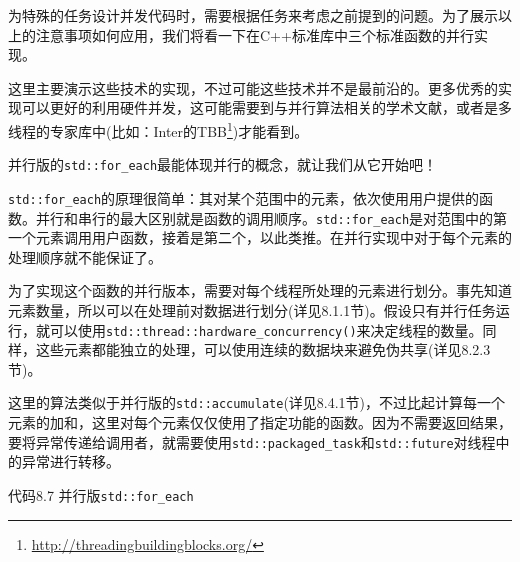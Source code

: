 
为特殊的任务设计并发代码时，需要根据任务来考虑之前提到的问题。为了展示以上的注意事项如何应用，我们将看一下在C++标准库中三个标准函数的并行实现。

这里主要演示这些技术的实现，不过可能这些技术并不是最前沿的。更多优秀的实现可以更好的利用硬件并发，这可能需要到与并行算法相关的学术文献，或者是多线程的专家库中(比如：Inter的TBB\footnote[4]{\url{http://threadingbuildingblocks.org/}})才能看到。

并行版的\texttt{std::for\_each}最能体现并行的概念，就让我们从它开始吧！


\texttt{std::for\_each}的原理很简单：其对某个范围中的元素，依次使用用户提供的函数。并行和串行的最大区别就是函数的调用顺序。\texttt{std::for\_each}是对范围中的第一个元素调用用户函数，接着是第二个，以此类推。在并行实现中对于每个元素的处理顺序就不能保证了。

为了实现这个函数的并行版本，需要对每个线程所处理的元素进行划分。事先知道元素数量，所以可以在处理前对数据进行划分(详见8.1.1节)。假设只有并行任务运行，就可以使用\texttt{std::thread::hardware\_concurrency()}来决定线程的数量。同样，这些元素都能独立的处理，可以使用连续的数据块来避免伪共享(详见8.2.3节)。

这里的算法类似于并行版的\texttt{std::accumulate}(详见8.4.1节)，不过比起计算每一个元素的加和，这里对每个元素仅仅使用了指定功能的函数。因为不需要返回结果，要将异常传递给调用者，就需要使用\texttt{std::packaged\_task}和\texttt{std::future}对线程中的异常进行转移。

代码8.7 并行版\texttt{std::for\_each}

